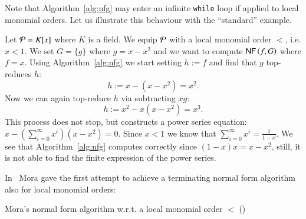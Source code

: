 Note that Algorithm~\ref{alg:nfg} may enter an infinite \texttt{while} loop if applied
to local monomial orders. Let us illustrate this behaviour with the ``standard''
example. 

\begin{example}
Let $\mathcal{P} = K[x]$ where $K$ is a field. We equip $\mathcal{P}$ with a local monomial
order $<$, i.e. $x < 1$. We set $G = \{g\}$ where $g=x-x^2$ and we want to
compute $\text{\sffamily{NF}}\left({f},{G}\right)$ where $f = x$. Using Algorithm~\ref{alg:nfg} we start setting
$h := f$ and find that $g$ top-reduces $h$:
\[h := x - \left(x-x^2\right) = x^2.\]
Now we can again top-reduce $h$ via subtracting $xg$:
\[h := x^2 - x\left(x-x^2\right) = x^3.\]
This process does not stop, but constructs a power series equation:
$x - \left(\sum_{i=0}^\infty x^i\right) \left(x-x^2\right) = 0.$
Since $x<1$ we know that $\sum_{i=0}^\infty x^i = \frac{1}{1-x}$. We see that
Algorithm~\ref{alg:nfg} computes correctly since $(1-x) x = x-x^2$,
still, it is not able to find the finite expression of the power series.
\end{example}

In~\cite{mora82} Mora gave the first attempt to achieve a terminating normal
form algorithm also for local monomial orders:

\begin{algorithm}[h]
\caption{Mora's normal form algorithm w.r.t. a local monomial order $<$
  (\nfn)} 
\label{alg:nfl}
\begin{algorithmic}[1]
\EndIf
{}
\EndWhile
{}
\end{algorithmic}
\end{algorithm}

